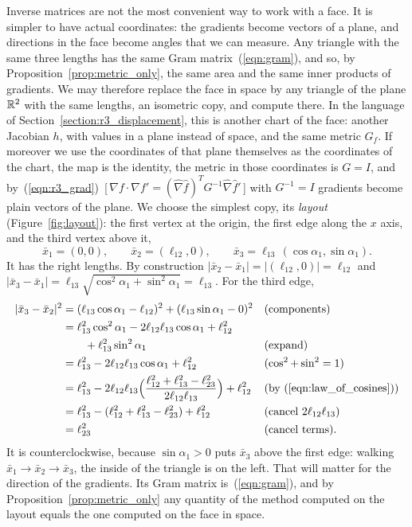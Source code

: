 Inverse matrices are not the most convenient way to work with a face. It is simpler to have actual coordinates: the gradients become vectors of a plane, and directions in the face become angles that we can measure. Any triangle with the same three lengths has the same Gram matrix~(\ref{eqn:gram}), and so, by Proposition~\ref{prop:metric_only}, the same area and the same inner products of gradients. We may therefore replace the face in space by any triangle of the plane $\mathbb{R}^2$ with the same lengths, an isometric copy, and compute there. In the language of Section~\ref{section:r3_displacement}, this is another chart of the face: another Jacobian $h$, with values in a plane instead of space, and the same metric $G_f$. If moreover we use the coordinates of that plane themselves as the coordinates of the chart, the map is the identity, the metric in those coordinates is $G = I$, and by~(\ref{eqn:r3_grad})~[\,$\nabla f\cdot\nabla f' = (\hat\nabla\hat f)^TG^{-1}\hat\nabla\hat f'$\,] with $G^{-1} = I$ gradients become plain vectors of the plane. We choose the simplest copy, its \emph{layout} (Figure~\ref{fig:layout}): the first vertex at the origin, the first edge along the $x$ axis, and the third vertex above it,
\begin{equation}
\label{eqn:layout}
\bar x_1 = (0, 0), \qquad \bar x_2 = (\ell_{12}, 0), \qquad \bar x_3 = \ell_{13}\, (\cos\alpha_1, \sin\alpha_1).
\end{equation}
It has the right lengths. By construction $|\bar x_2 - \bar x_1| = |(\ell_{12}, 0)| = \ell_{12}$ and $|\bar x_3 - \bar x_1| = \ell_{13}\sqrt{\cos^2\alpha_1 + \sin^2\alpha_1} = \ell_{13}$. For the third edge,
\begin{align*}
|\bar x_3 - \bar x_2|^2 &= (\ell_{13}\cos\alpha_1 - \ell_{12})^2 + (\ell_{13} \sin\alpha_1 - 0)^2 && \text{(components)} \\
&= \ell_{13}^2\cos^2\alpha_1 - 2 \ell_{12} \ell_{13} \cos\alpha_1 + \ell_{12}^2 \\ &\qquad + \ell_{13}^2 \sin^2\alpha_1 && \text{(expand)} \\
&= \ell_{13}^2 - 2 \ell_{12} \ell_{13} \cos\alpha_1 + \ell_{12}^2 && \text{($\cos^2 + \sin^2 = 1$)} \\
&= \ell_{13}^2 - 2 \ell_{12} \ell_{13} \Big(\frac{\ell_{12}^2 + \ell_{13}^2 - \ell_{23}^2}{2\ell_{12}\ell_{13}}\Big) + \ell_{12}^2 && \text{(by (\ref{eqn:law_of_cosines}))} \\
&= \ell_{13}^2 - (\ell_{12}^2 + \ell_{13}^2 - \ell_{23}^2) + \ell_{12}^2 && \text{(cancel $2\ell_{12}\ell_{13}$)} \\
&= \ell_{23}^2 && \text{(cancel terms).}
\end{align*}
It is counterclockwise, because $\sin\alpha_1 > 0$ puts $\bar x_3$ above the first edge: walking $\bar x_1 \to \bar x_2 \to \bar x_3$, the inside of the triangle is on the left. That will matter for the direction of the gradients. Its Gram matrix is~(\ref{eqn:gram}), and by Proposition~\ref{prop:metric_only} any quantity of the method computed on the layout equals the one computed on the face in space.

